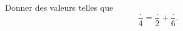 
\begin{exercice}\label{exosmath-0206}

Donner des valeurs telles que
\begin{equation}
    \frac{ . }{ 4 }=\frac{ . }{ 2 }+\frac{ . }{ 6 }.
\end{equation}

\end{exercice}
